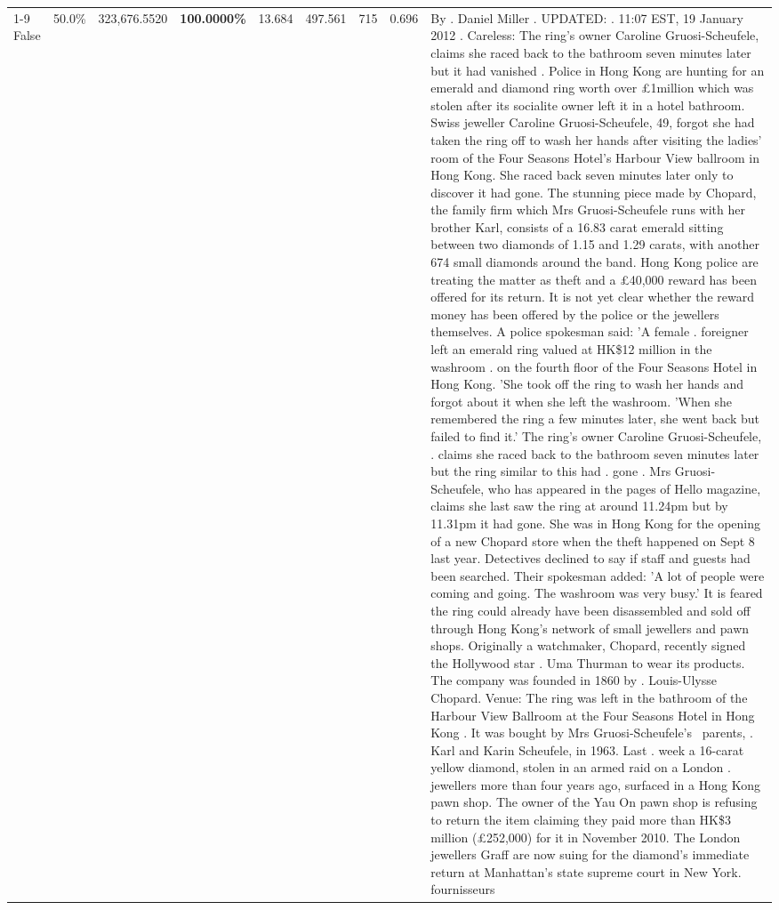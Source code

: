 \begin{table}[H]
\begin{tabular}{lllrlllll}
\cline{1-9}
False & 50.0\% & 323,676.5520 & \bfseries \color{red} 100.0000\% & 13.684 & 497.561 & 715 & 0.696 & By . Daniel Miller . UPDATED: . 11:07 EST, 19 January 2012 . Careless: The ring's owner Caroline Gruosi-Scheufele, claims she raced back to the bathroom seven minutes later but it had vanished . Police in Hong Kong are hunting for an emerald and diamond ring worth over £1million which was stolen after its socialite owner left it in a hotel bathroom. Swiss jeweller Caroline Gruosi-Scheufele, 49, forgot she had taken the ring off to wash her hands after visiting the ladies' room of the Four Seasons Hotel's Harbour View ballroom in Hong Kong. She raced back seven minutes later only to discover it had gone. The stunning piece made by Chopard, the family firm which Mrs Gruosi-Scheufele runs with her brother Karl, consists of a 16.83 carat emerald sitting between two diamonds of 1.15 and 1.29 carats, with another 674 small diamonds around the band. Hong Kong police are treating the matter as theft and a £40,000 reward has been offered for its return. It is not yet clear whether the reward money has been offered by the police or the jewellers themselves. A police spokesman said: 'A female . foreigner left an emerald ring valued at HK\$12 million in the washroom . on the fourth floor of the Four Seasons Hotel in Hong Kong. 'She took off the ring to wash her hands and forgot about it when she left the washroom. 'When she remembered the ring a few minutes later, she went back but failed to find it.' The ring's owner Caroline Gruosi-Scheufele, . claims she raced back to the bathroom seven minutes later but the ring similar to this had . gone . Mrs Gruosi-Scheufele, who has appeared in the pages of Hello magazine, claims she last saw the ring at around 11.24pm but by 11.31pm it had gone. She was in Hong Kong for the opening of a new Chopard store when the theft happened on Sept 8 last year. Detectives declined to say if staff and guests had been searched. Their spokesman added: 'A lot of people were coming and going. The washroom was very busy.' It is feared the ring could already have been disassembled and sold off through Hong Kong's network of small jewellers and pawn shops. Originally a watchmaker, Chopard, recently signed the Hollywood star . Uma Thurman to wear its products. The company was founded in 1860 by . Louis-Ulysse Chopard. Venue: The ring was left in the bathroom of the Harbour View Ballroom at the Four Seasons Hotel in Hong Kong . It was bought by Mrs Gruosi-Scheufele's  parents, . Karl and Karin Scheufele, in 1963. Last . week a 16-carat yellow diamond, stolen in an armed raid on a London . jewellers more than four years ago, surfaced in a Hong Kong pawn shop. The owner of the Yau On pawn shop is refusing to return the item claiming they paid more than HK\$3 million (£252,000) for it in November 2010. The London jewellers Graff are now suing for the diamond’s immediate return at Manhattan’s state supreme court in New York. fournisseurs \\

\end{tabular}
\end{table}
